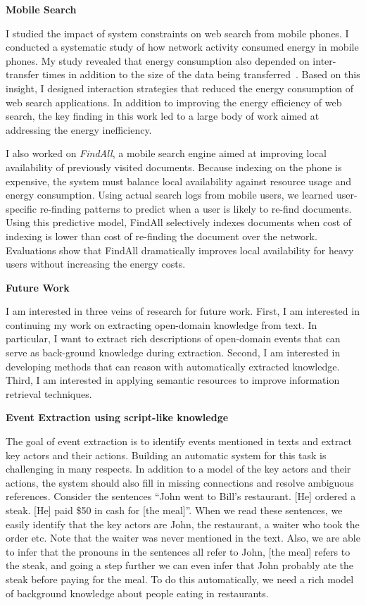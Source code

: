 \documentclass[a4paper,11pt,onecolumn]{article}
\begin{document}
{\bf Mobile Search}

I studied the impact of system constraints on web search from mobile phones. I conducted a systematic study of how network activity consumed energy in mobile phones. My study revealed that energy consumption also depended on inter-transfer times in addition to the size of the data being transferred~\cite{balasubramanian-imc09}. Based on this insight, I designed interaction strategies that reduced the energy consumption of web search applications. In addition to improving the energy efficiency of web search, the key finding in this work led to a large body of work aimed at addressing the energy inefficiency.

I also worked on {\em FindAll}, a mobile search engine aimed at improving local availability of previously visited documents. Because indexing on the phone is expensive, the system must balance local availability against resource usage and energy consumption. Using actual search logs from mobile users, we learned user-specific re-finding patterns to predict when a user is likely to re-find documents. Using this predictive model, FindAll selectively indexes documents when cost of indexing is lower than cost of re-finding the document over the network. Evaluations show that FindAll dramatically improves local availability for heavy users without increasing the energy costs.

{\bf Future Work}

I am interested in three veins of research for future work. First, I am interested in continuing my work on extracting open-domain knowledge from text. In particular, I want to extract rich descriptions of open-domain events that can serve as back-ground knowledge during extraction. Second, I am interested in developing methods that can reason with automatically extracted knowledge. Third, I am interested in applying semantic resources to improve information retrieval techniques.

{\bf Event Extraction using script-like knowledge}

The goal of event extraction is to identify events mentioned in texts and extract key actors and their actions. Building an automatic system for this task is challenging in many respects. In addition to a model of the key actors and their actions, the system should also fill in missing connections and resolve ambiguous references. Consider the sentences ``John went to Bill's restaurant. [He] ordered a steak. [He] paid \$50 in cash for [the meal]''. When we read these sentences, we easily identify that the key actors are John, the restaurant, a waiter who took the order etc. Note that the waiter was never mentioned in the text. Also, we are able to infer that the pronouns in the sentences all refer to John, [the meal] refers to the steak, and going a step further we can even infer that John probably ate the steak before paying for the meal. To do this automatically, we need a rich model of background knowledge about people eating in restaurants. 
\end{document}
